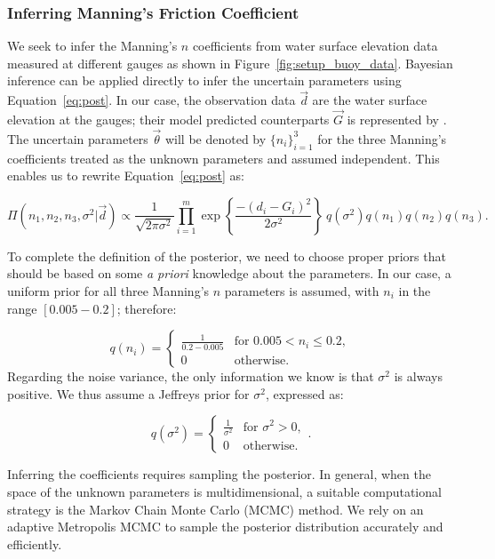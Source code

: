 \subsubsection{Inferring Manning's Friction Coefficient}
\label{sec:infmanning}
 
We seek to infer the Manning's $n$ coefficients from water surface elevation
data measured at different gauges as shown in Figure~\ref{fig:setup_buoy_data}.
Bayesian inference can be applied directly to infer the uncertain parameters
using Equation~\eqref{eq:post}. In our case, the observation data $\vec d$ 
are the water surface elevation at the gauges;
their model predicted counterparts $\vec G$ is represented by \geoclaw.
The uncertain parameters $\vec \theta$ will be denoted by $\{n_i\}_{i=1}^3$ for the
three Manning's coefficients treated as the unknown parameters and assumed independent. 
This enables us to rewrite Equation~\eqref{eq:post} as:

\begin{equation} 
\Pi(n_1,n_2,n_3,\sigma^2 | \vec d) 
\propto \frac{1}{\sqrt{2 \pi \sigma^2}} 
 \prod_{i=1}^m  
\exp \left\lbrace \frac{-(d_i - G_i)^2}{2 \sigma^2} \right\rbrace
\ q(\sigma^2)q(n_1)q(n_2) q(n_3).
\label{eq:post_coef}
\end{equation}

To complete the definition of the posterior, we need to choose proper priors that should be based 
on some \emph{a priori} knowledge about the parameters. In our case, a uniform
prior for all three Manning's $n$ parameters is assumed, with $n_i$ in the range  $[0.005 - 0.2]$; therefore:

\begin{equation} 
q(n_i) = \begin{cases}
		\displaystyle \frac{1}{0.2-0.005} &\text{for~} 0.005 <  n_i \leq 0.2 ,  \\
		0 &\text{otherwise}.
\end{cases}
\end{equation}
Regarding the noise variance, the only information we know 
is that $\sigma^2$ is always positive.
We thus assume a Jeffreys prior \citep{sivia} for $\sigma^2$, expressed as:

\begin{equation} 
q(\sigma^2) =  \begin{cases}
		\displaystyle \frac{1}{\sigma^2} &\text{for~} \sigma^2 > 0,  \\
		0 &\text{otherwise}. 
		\end{cases}.
\label{eq:var_pr}
\end{equation}

Inferring the coefficients requires 
sampling the posterior. In general, when the space of the unknown 
parameters is multidimensional, a suitable computational strategy is 
the Markov Chain Monte  Carlo (MCMC) method. 
We rely on an adaptive Metropolis MCMC \citep{Gareth2009,Haario2001} to
sample the posterior distribution accurately and efficiently.


